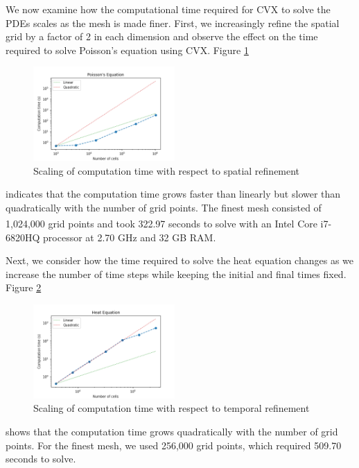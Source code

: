 \documentclass[conference]{IEEEtran}
\begin{document}
We now examine how the computational time required for CVX to solve the PDEs scales as the mesh is made finer. First, we increasingly refine the spatial grid by a factor of 2 in each dimension and observe the effect on the time required to solve Poisson's equation using CVX. Figure \ref{fig:poisson-scale} 
\begin{figure}[h]
  \begin{center}
    \includegraphics[width=0.48\textwidth]{figures/poisson-scale}
    \caption{Scaling of computation time with respect to spatial refinement}
    \label{fig:poisson-scale}
  \end{center}
\end{figure}
indicates that the computation time grows faster than linearly but slower than quadratically with the number of grid points. The finest mesh consisted of 1,024,000 grid points and took 322.97 seconds to solve with an Intel\textsuperscript{\textregistered} Core\texttrademark{} i7-6820HQ processor at 2.70 GHz and 32 GB RAM.

Next, we consider how the time required to solve the heat equation changes as we increase the number of time steps while keeping the initial and final times fixed. Figure \ref{fig:heat-scale}
\begin{figure}[h]
  \begin{center}
    \includegraphics[width=0.48\textwidth]{figures/heat-scale}
    \caption{Scaling of computation time with respect to temporal refinement}
    \label{fig:heat-scale}
  \end{center}
\end{figure}
shows that the computation time grows quadratically with the number of grid points. For the finest mesh, we used 256,000 grid points, which required 509.70 seconds to solve.
\end{document}
